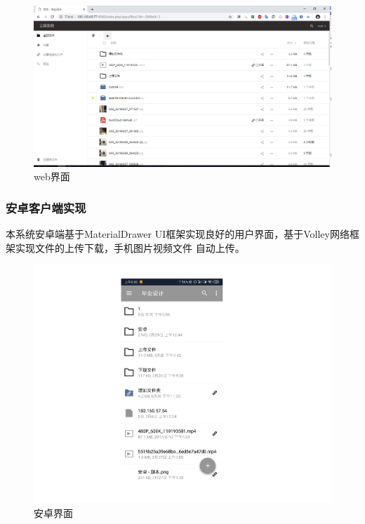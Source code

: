 \begin{figure}[H]
  \centering
  \includegraphics[width=130mm]{./figures/web1.png}
  \caption{web界面}
  \label{web_jiemian}
\end{figure}
\subsubsection{安卓客户端实现}
\par 本系统安卓端基于MaterialDrawer UI框架实现良好的用户界面，基于Volley网络框架实现文件的上传下载，手机图片视频文件
自动上传。
\begin{figure}[H]
  \centering
  \includegraphics[width=130mm]{./figures/android2.png}
  \caption{安卓界面}
  \label{android_jiemian}
\end{figure}


